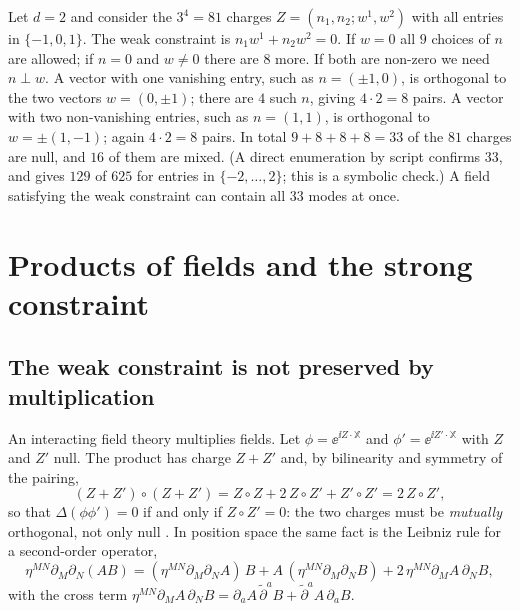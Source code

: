 \begin{example}\label{ex:doubled:count}
Let $d=2$ and consider the $3^4=81$ charges $Z=(n_1,n_2;w^1,w^2)$ with all entries in
$\{-1,0,1\}$. The weak constraint is $n_1w^1+n_2w^2=0$. If $w=0$ all $9$ choices of $n$ are
allowed; if $n=0$ and $w\ne0$ there are $8$ more. If both are non-zero we need $n\perp w$. A
vector with one vanishing entry, such as $n=(\pm1,0)$, is orthogonal to the two vectors
$w=(0,\pm1)$; there are $4$ such $n$, giving $4\cdot2=8$ pairs. A vector with two non-vanishing
entries, such as $n=(1,1)$, is orthogonal to $w=\pm(1,-1)$; again $4\cdot2=8$ pairs. In total
$9+8+8+8=33$ of the $81$ charges are null, and $16$ of them are mixed. (A direct enumeration by
script confirms $33$, and gives $129$ of $625$ for entries in $\{-2,\dots,2\}$; this is a
symbolic check.) A field satisfying the weak constraint can contain all $33$ modes at once.
\end{example}

\section{Products of fields and the strong constraint}\label{sec:doubled:strong}

\subsection{The weak constraint is not preserved by multiplication}

An interacting field theory multiplies fields. Let $\phi=\ee^{\ii Z\cdot\mathbb X}$ and
$\phi'=\ee^{\ii Z'\cdot\mathbb X}$ with $Z$ and $Z'$ null. The product has charge $Z+Z'$ and, by
bilinearity and symmetry of the pairing,
\begin{equation}\label{eq:doubled:polar}
(Z+Z')\circ(Z+Z')=Z\circ Z+2\,Z\circ Z'+Z'\circ Z'=2\,Z\circ Z' ,
\end{equation}
so that $\Delta(\phi\phi')=0$ if and only if $Z\circ Z'=0$: the two charges must be
\emph{mutually} orthogonal, not only null . In
position space the same fact is the Leibniz rule for a second-order operator,
\begin{equation}\label{eq:doubled:leibniz}
\eta^{MN}\partial_M\partial_N(AB)=(\eta^{MN}\partial_M\partial_NA)\,B+A\,(\eta^{MN}\partial_M
\partial_NB)+2\,\eta^{MN}\partial_MA\,\partial_NB ,
\end{equation}
with the cross term $\eta^{MN}\partial_MA\,\partial_NB=\partial_aA\,\tilde\partial^aB+
\tilde\partial^aA\,\partial_aB$.

